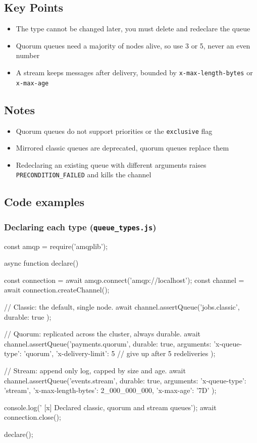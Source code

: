 \documentclass[11pt,a4paper]{article}
\begin{document}
\subsection*{Key Points}

\begin{itemize}\itemsep2pt
  \item The type cannot be changed later, you must delete and redeclare the queue
  \item Quorum queues need a majority of nodes alive, so use 3 or 5, never an even number
  \item A stream keeps messages after delivery, bounded by
        \lstinline|x-max-length-bytes| or \lstinline|x-max-age|
\end{itemize}

\subsection*{Notes}

\begin{itemize}\itemsep2pt
  \item Quorum queues do not support priorities or the \lstinline|exclusive| flag
  \item Mirrored classic queues are deprecated, quorum queues replace them
  \item Redeclaring an existing queue with different arguments raises
        \lstinline|PRECONDITION_FAILED| and kills the channel
\end{itemize}

\newpage
\subsection{Code examples}

\subsubsection*{Declaring each type (\texttt{queue\_types.js})}
\begin{js}
const amqp = require('amqplib');

async function declare() {
    const connection = await amqp.connect('amqp://localhost');
    const channel = await connection.createChannel();

    // Classic: the default, single node.
    await channel.assertQueue('jobs.classic', { durable: true });

    // Quorum: replicated across the cluster, always durable.
    await channel.assertQueue('payments.quorum', {
        durable: true,
        arguments: {
            'x-queue-type': 'quorum',
            'x-delivery-limit': 5   // give up after 5 redeliveries
        }
    });

    // Stream: append only log, capped by size and age.
    await channel.assertQueue('events.stream', {
        durable: true,
        arguments: {
            'x-queue-type': 'stream',
            'x-max-length-bytes': 2_000_000_000,
            'x-max-age': '7D'
        }
    });

    console.log(' [x] Declared classic, quorum and stream queues');
    await connection.close();
}
declare();
\end{js}
\end{document}

